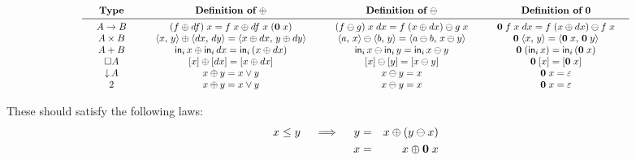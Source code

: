 \documentclass{article}
\begin{document}
\begin{center}
\[
\scalebox{0.85}{\(
\arraycolsep=1.5em
\begin{array}{cccc}
  \textbf{Type}
  & {\textbf{Definition of}~\oplus}
  & {\textbf{Definition of}~\ominus}
  & {\textbf{Definition of}~\zero}
  \\ \midrule
  A \to B
  & (f \oplus df)\; x = f\; x \oplus df\; x\; (\zero\; x)
  & (f \ominus g)\; x \;dx = f\; (x \oplus dx) \ominus g \; x
  & \zero\; f\; x\; dx = f\; (x \oplus dx) \ominus f\; x
  \\
  A \x B
  & \pair{x}{y} \oplus \pair{dx}{dy} = \pair{x \oplus dx}{y \oplus dy}
  & \pair{a}{x} \ominus \pair{b}{y} = \pair{a \ominus b}{x \ominus y}
  & \zero \; \pair{x}{y} = \pair{\zero\; x}{\zero\; y}
  \\
  A + B
  & \inj{i}{x} \oplus \inj{i}{dx} = \inj{i}{(x \oplus dx)}
  & \inj{i}{x} \ominus \inj{i}{y} = \inj{i}{x \ominus y}
  & \zero\; (\inj{i}{x}) = \inj{i}{(\zero\;x)}
  \\
  \Disc{A}
  & \disc{x} \oplus \disc{dx} = \disc{x \oplus dx}
  & \disc{x} \ominus \disc{y} = \disc{x \ominus y}
  & \zero\; \disc{x} = \disc{\zero\; x}
  \\
  \Down{A}
  & x \oplus y = x \vee y
  & x \ominus y = x
  & \zero\; x = \unit
  \\
  \tbool
  & x \oplus y = x \vee y
  & x \ominus y = x
  & \zero\; x = \unit
\end{array}
\)}
\]
\end{center}

These should satisfy the following laws:
\begin{eqnarray}
  x \le y \quad\implies\quad
  y &=& x \oplus (y \ominus x)\\
  x &=& x \oplus \mathbf{0}\; x
\end{eqnarray}




\end{document}
